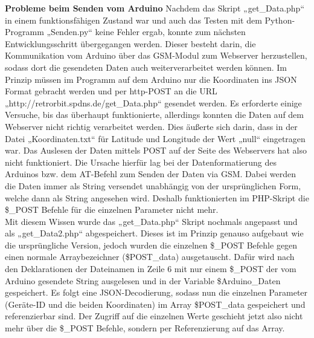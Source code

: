 \textbf{Probleme beim Senden vom Arduino }Nachdem das Skript „get\_Data.php“ in einem funktionsfähigen Zustand war und auch das Testen mit dem Python-Programm „Senden.py“ keine Fehler ergab, konnte zum nächsten Entwicklungsschritt übergegangen werden. Dieser besteht darin, die Kommunikation vom Arduino über das GSM-Modul zum Webserver herzustellen, sodass dort die gesendeten Daten auch weiterverarbeitet werden können.
Im Prinzip müssen im Programm auf dem Arduino nur die Koordinaten ins JSON Format gebracht werden und per http-POST an die URL „http://retrorbit.spdns.de/get\_Data.php“ gesendet werden. Es erforderte einige Versuche, bis das überhaupt funktionierte, allerdings konnten die Daten auf dem Webserver nicht richtig verarbeitet werden. Dies äußerte sich darin, dass in der Datei „Koordinaten.txt“ für Latitude und Longitude der Wert „null“ eingetragen war. Das Auslesen der Daten mittels POST auf der Seite des Webservers hat also nicht funktioniert. Die Ursache hierfür lag bei der Datenformatierung des Arduinos bzw. dem AT-Befehl zum Senden der Daten via GSM. Dabei werden die Daten immer als String versendet unabhängig von der ursprünglichen Form, welche dann als String angesehen wird. Deshalb funktionierten im PHP-Skript die \$\_POST Befehle für die einzelnen Parameter nicht mehr.
\\
Mit diesem Wissen wurde das „get\_Data.php“ Skript nochmals angepasst und als „get\_Data2.php“ abgespeichert. Dieses ist im Prinzip genauso aufgebaut wie die ursprüngliche Version, jedoch wurden die einzelnen \$\_POST Befehle gegen einen normale Arraybezeichner (\$POST\_data) ausgetauscht. Dafür wird nach den Deklarationen der Dateinamen in Zeile 6 mit nur einem  \$\_POST der vom Arduino gesendete String ausgelesen und in der Variable \$Arduino\_Daten gespeichert. Es folgt eine JSON-Decodierung, sodass nun die einzelnen Parameter (Geräte-ID und die beiden Koordinaten) im Array \$POST\_data gespeichert und referenzierbar sind. Der Zugriff auf die einzelnen Werte geschieht jetzt also nicht mehr über die \$\_POST Befehle, sondern per Referenzierung auf das Array.

